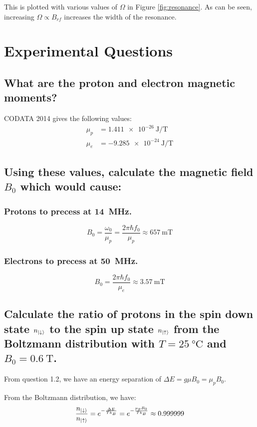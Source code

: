 \documentclass[a4paper]{scrartcl}
\begin{document}
This is plotted with various values of \(\Omega\) in Figure \ref{fig:resonance}. As can be seen, increasing \(\Omega \propto B_{rf}\) increases the width of the resonance.

\section{Experimental Questions}
\subsection{What are the proton and electron magnetic moments?}
CODATA 2014 gives the following values:
\begin{align*}
    \mu_p &= \SI{1.411e-26}{\joule\per\tesla} \\
    \mu_e &= \SI{-9.285e-24}{\joule\per\tesla}
\end{align*}

\subsection{Using these values, calculate the magnetic field \(B_0\) which would cause:}
\subsubsection{Protons to precess at \SI{14}{\mega\hertz}.}
\[B_0 = \frac{\omega_0}{\mu_p} = \frac{2 \pi \hbar f_0}{\mu_p} \approx \SI{657}{\milli\tesla}\]

\subsubsection{Electrons to precess at \SI{50}{\mega\hertz}.}
\[B_0 = \frac{2 \pi \hbar f_0}{\mu_e} \approx \SI{3.57}{\milli\tesla}\]

\subsection{Calculate the ratio of protons in the spin down state \(n_{\ket{\downarrow}}\) to the spin up state \(n_{\ket{\uparrow}}\) from the Boltzmann distribution with \(T = \SI{25}{\degreeCelsius}\) and \(B_0 = \SI{0.6}{\tesla}\).}
From question 1.2, we have an energy separation of \(\Delta E = g \mu B_0 = \mu_p B_0\).

From the Boltzmann distribution, we have:
\[\frac{n_{\ket{\downarrow}}}{n_{\ket{\uparrow}}} = e^{-\frac{\Delta E}{T k_B}} = e^{-\frac{\mu_p B_0}{T k_B}} \approx 0.999999\]
\end{document}
